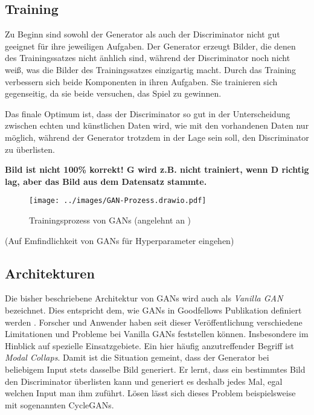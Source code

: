 \subsection{Training}
Zu Beginn sind sowohl der Generator als auch der Discriminator nicht gut geeignet für ihre jeweiligen Aufgaben. Der Generator erzeugt Bilder, die denen des Trainingssatzes nicht änhlich sind, während der Discriminator noch nicht weiß, was die Bilder des Trainingssatzes einzigartig macht. Durch das Training verbessern sich beide Komponenten in ihren Aufgaben. Sie trainieren sich gegenseitig, da sie beide versuchen, das Spiel zu gewinnen.

Das finale Optimum ist, dass der Discriminator so gut in der Unterscheidung zwischen echten und künstlichen Daten wird, wie mit den vorhandenen Daten nur möglich, während der Generator trotzdem in der Lage sein soll, den Discriminator zu überlisten. \cite[S. 656]{visualApproach}

\textbf{Bild ist nicht 100\% korrekt! G wird z.B. nicht trainiert, wenn D richtig lag, aber das Bild aus dem Datensatz stammte.}
\begin{figure}[H]
	\centering
	\texttt{[image: ../images/GAN-Prozess.drawio.pdf]}
	\caption{Trainingsprozess von GANs (angelehnt an \cite[S. 654f.]{visualApproach})}
	\label{fig:gan-trainingsprozess}
\end{figure}

(Auf Emfindlichkeit von GANs für Hyperparameter eingehen)

\subsection{Architekturen}
Die bisher beschriebene Architektur von \acp{GAN} wird auch als \emph{Vanilla \ac{GAN}} bezeichnet. Dies entspricht dem, wie \acp{GAN} in Goodfellows Publikation definiert werden \cite{Goodfellow-GANs}. Forscher und Anwender haben seit dieser Veröffentlichung verschiedene Limitationen und Probleme bei Vanilla \acp{GAN} feststellen können. Insbesondere im Hinblick auf spezielle Einsatzgebiete. Ein hier häufig anzutreffender Begriff ist \emph{Modal Collaps}. Damit ist die Situation gemeint, dass der Generator bei beliebigem Input stets dasselbe Bild generiert. Er lernt, dass ein bestimmtes Bild den Discriminator überlisten kann und generiert es deshalb jedes Mal, egal welchen Input man ihm zuführt. Lösen lässt sich dieses Problem beispielsweise mit sogenannten \acp{CycleGAN}.

